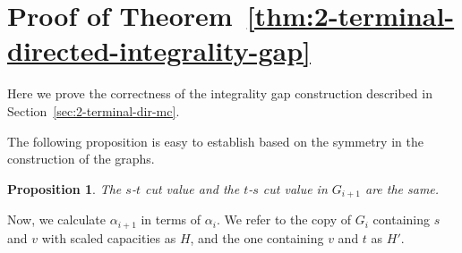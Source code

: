 \documentclass[11pt]{article}
\newtheorem{prop}[lemma]{Proposition}
\begin{document}



\appendix
\section{Proof of Theorem~\ref{thm:2-terminal-directed-integrality-gap}}
Here we prove the correctness of the integrality gap construction
described in Section~\ref{sec:2-terminal-dir-mc}.

The following proposition is easy to establish based on the symmetry in
the construction of the graphs.
\begin{prop}
  The $s$-$t$ cut value and the $t$-$s$ cut value in $G_{i+1}$ are the same.
\end{prop}

Now, we calculate $\alpha_{i+1}$ in terms of $\alpha_i$. We refer to the
copy of $G_i$ containing $s$ and $v$ with scaled capacities as $H$, and the one 
containing $v$ and $t$ as $H'$.
\end{document}
